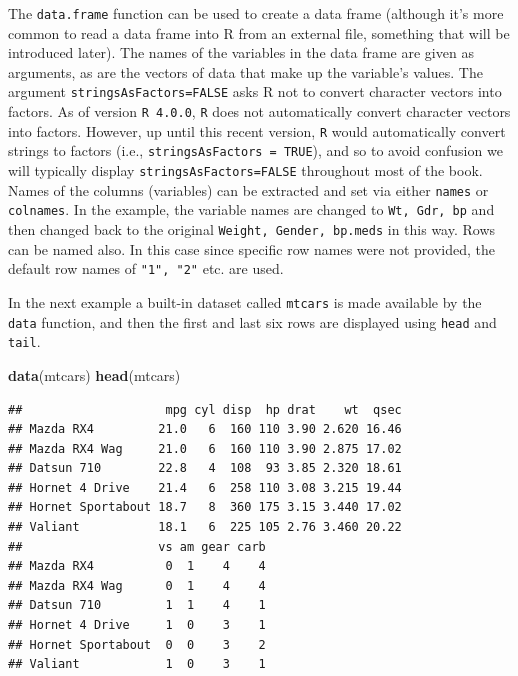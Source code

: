 \documentclass[
]{krantz}
\newenvironment{Shaded}{\begin{snugshade}}{\end{snugshade}}
\newcommand{\KeywordTok}[1]{\textcolor[rgb]{0.13,0.29,0.53}{\textbf{#1}}}
\newcommand{\NormalTok}[1]{#1}
\begin{document}
The \texttt{data.frame} function can be used to create a data frame (although it's more common to read a data frame into R from an external file, something that will be introduced later). The names of the variables in the data frame are given as arguments, as are the vectors of data that make up the variable's values. The argument \texttt{stringsAsFactors=FALSE} asks R not to convert character vectors into factors. As of version \texttt{R\ 4.0.0}, \texttt{R} does not automatically convert character vectors into factors. However, up until this recent version, \texttt{R} would automatically convert strings to factors (i.e., \texttt{stringsAsFactors\ =\ TRUE}), and so to avoid confusion we will typically display \texttt{stringsAsFactors=FALSE} throughout most of the book. Names of the columns (variables) can be extracted and set via either \texttt{names} or \texttt{colnames}. In the example, the variable names are changed to \texttt{Wt,\ Gdr,\ bp} and then changed back to the original \texttt{Weight,\ Gender,\ bp.meds} in this way. Rows can be named also. In this case since specific row names were not provided, the default row names of \texttt{"1",\ "2"} etc. are used.

In the next example a built-in dataset called \texttt{mtcars} is made available by the \texttt{data} function, and then the first and last six rows are displayed using \texttt{head} and \texttt{tail}.

\begin{Shaded}
\begin{Highlighting}[]
\KeywordTok{data}\NormalTok{(mtcars)}
\KeywordTok{head}\NormalTok{(mtcars)}
\end{Highlighting}
\end{Shaded}

\begin{verbatim}
##                    mpg cyl disp  hp drat    wt  qsec
## Mazda RX4         21.0   6  160 110 3.90 2.620 16.46
## Mazda RX4 Wag     21.0   6  160 110 3.90 2.875 17.02
## Datsun 710        22.8   4  108  93 3.85 2.320 18.61
## Hornet 4 Drive    21.4   6  258 110 3.08 3.215 19.44
## Hornet Sportabout 18.7   8  360 175 3.15 3.440 17.02
## Valiant           18.1   6  225 105 2.76 3.460 20.22
##                   vs am gear carb
## Mazda RX4          0  1    4    4
## Mazda RX4 Wag      0  1    4    4
## Datsun 710         1  1    4    1
## Hornet 4 Drive     1  0    3    1
## Hornet Sportabout  0  0    3    2
## Valiant            1  0    3    1
\end{verbatim}
\end{document}
